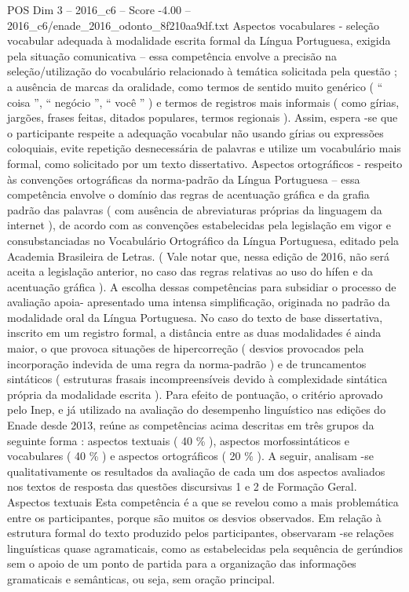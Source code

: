 \begin{textsample}{POS Dim 3 – 2016\_c6 – Score -4.00 – 2016\_c6/enade\_2016\_odonto\_8f210aa9df.txt}
Aspectos vocabulares - seleção vocabular adequada à modalidade escrita formal da Língua Portuguesa, exigida pela situação comunicativa – essa competência envolve a precisão na seleção/utilização do vocabulário relacionado à temática solicitada pela questão ; a ausência de marcas da oralidade, como termos de sentido muito genérico ( “ coisa ”, “ negócio ”, “ você ” ) e termos de registros mais informais ( como gírias, jargões, frases feitas, ditados populares, termos regionais ).
Assim, espera -se que o participante respeite a adequação vocabular não usando gírias ou expressões coloquiais, evite repetição desnecessária de palavras e utilize um vocabulário mais formal, como solicitado por um texto dissertativo.
Aspectos ortográficos - respeito às convenções ortográficas da norma-padrão da Língua Portuguesa – essa competência envolve o domínio das regras de acentuação gráfica e da grafia padrão das palavras ( com ausência de abreviaturas próprias da linguagem da internet ), de acordo com as convenções estabelecidas pela legislação em vigor e consubstanciadas no Vocabulário Ortográfico da Língua Portuguesa, editado pela Academia Brasileira de Letras. ( Vale notar que, nessa edição de 2016, não será aceita a legislação anterior, no caso das regras relativas ao uso do hífen e da acentuação gráfica ).
A escolha dessas competências para subsidiar o processo de avaliação apoia- apresentado uma intensa simplificação, originada no padrão da modalidade oral da Língua Portuguesa.
No caso do texto de base dissertativa, inscrito em um registro formal, a distância entre as duas modalidades é ainda maior, o que provoca situações de hipercorreção ( desvios provocados pela incorporação indevida de uma regra da norma-padrão ) e de truncamentos sintáticos ( estruturas frasais incompreensíveis devido à complexidade sintática própria da modalidade escrita ).
Para efeito de pontuação, o critério aprovado pelo Inep, e já utilizado na avaliação do desempenho linguístico nas edições do Enade desde 2013, reúne as competências acima descritas em três grupos da seguinte forma : aspectos textuais ( 40 \% ), aspectos morfossintáticos e vocabulares ( 40 \% ) e aspectos ortográficos ( 20 \% ).
A seguir, analisam -se qualitativamente os resultados da avaliação de cada um dos aspectos avaliados nos textos de resposta das questões discursivas 1 e 2 de Formação Geral.
Aspectos textuais Esta competência é a que se revelou como a mais problemática entre os participantes, porque são muitos os desvios observados.
Em relação à estrutura formal do texto produzido pelos participantes, observaram -se relações linguísticas quase agramaticais, como as estabelecidas pela sequência de gerúndios sem o apoio de um ponto de partida para a organização das informações gramaticais e semânticas, ou seja, sem oração principal.

\end{textsample}
